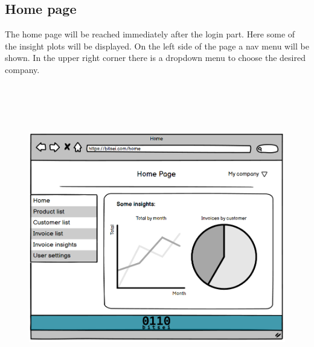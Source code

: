 \subsection{Home page}
The home page will be reached immediately after the login part. Here some of the insight plots will be displayed. On the left side of the page a nav menu will be shown. In the upper right corner there is a dropdown menu to choose the desired company.
\begin{figure}[h!]
    \centering
    \includegraphics[height=380pt, keepaspectratio]{resources/mockup/Home.png}
\end{figure}
\newpage
